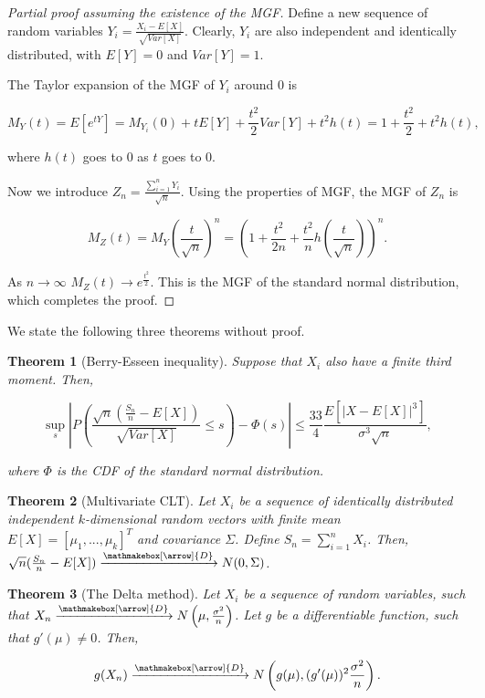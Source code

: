 \documentclass{book}
\theoremstyle{plain}%
\newtheorem{theorem}{Theorem}[section]
\theoremstyle{definition}
\newlength{\arrow}
\newcommand*{\myrightarrow}[1]{\xrightarrow{\mathmakebox[\arrow]{#1}}}
\begin{document}
\begin{proof}[Partial proof assuming the existence of the MGF]
Define a new sequence of random variables $Y_i = \frac{X_i - E[X]}{\sqrt{Var[X]}}$. Clearly, $Y_i$ are also independent and identically distributed, with $E[Y] = 0$ and $Var[Y] = 1$.

The Taylor expansion of the MGF of $Y_i$ around 0 is

$$M_{Y}(t) = E[e^{tY}] = M_{Y_i}(0) + tE[Y] + \frac{t^2}{2}Var[Y] + t^2h(t) = 1 + \frac{t^2}{2} +  t^2h(t),$$

where $h(t)$ goes to 0 as $t$ goes to 0.

Now we introduce $Z_n = \frac{\sum_{i=1}^n Y_i}{\sqrt{n}}$. Using the properties of MGF, the MGF of $Z_n$ is


$$M_{Z}(t) = M_Y(\frac{t}{\sqrt{n}})^n = (1 + \frac{t^2}{2n} +  \frac{t^2}{n}h(\frac{t}{\sqrt{n}}))^n.$$

As $n \rightarrow \infty$ $M_{Z}(t) \rightarrow e^\frac{t^2}{2}$. This is the MGF of the standard normal distribution, which completes the proof.
\end{proof}

We state the following three theorems without proof.

\begin{theorem}[Berry-Esseen inequality]
Suppose that ${X_i}$ also have a finite third moment. Then,

$$\sup_s|P(\frac{\sqrt{n}(\frac{S_n}{n} - E[X])}{\sqrt{Var[X]}} \leq s) - \Phi(s)| \leq \frac{33}{4}\frac{E[|X - E[X]|^3]}{\sigma^3\sqrt{n}},$$

where $\Phi$ is the CDF of the standard normal distribution.
\end{theorem}

\begin{theorem}[Multivariate CLT]
Let $X_i$ be a sequence of identically distributed independent $k$-dimensional random vectors with finite mean $E[X] = [\mu_1,...,\mu_k]^T$ and covariance $\Sigma$. Define $S_n = \sum_{i=1}^n X_i$. Then,  $\sqrt{n}(\frac{S_n}{n} - E[X]) \myrightarrow{D} N(0,\Sigma)$.
\end{theorem}


\begin{theorem}[The Delta method]
Let $X_i$ be a sequence of random variables, such that $X_n \myrightarrow{D} N\left(\mu, \frac{\sigma^2}{n}\right)  $. Let $g$ be a differentiable function, such that $g'(\mu) \neq 0$. Then,

$$g(X_n) \myrightarrow{D} N\left(g(\mu), (g'(\mu))^2\frac{\sigma^2}{n}\right).$$
\end{theorem}
\end{document}
